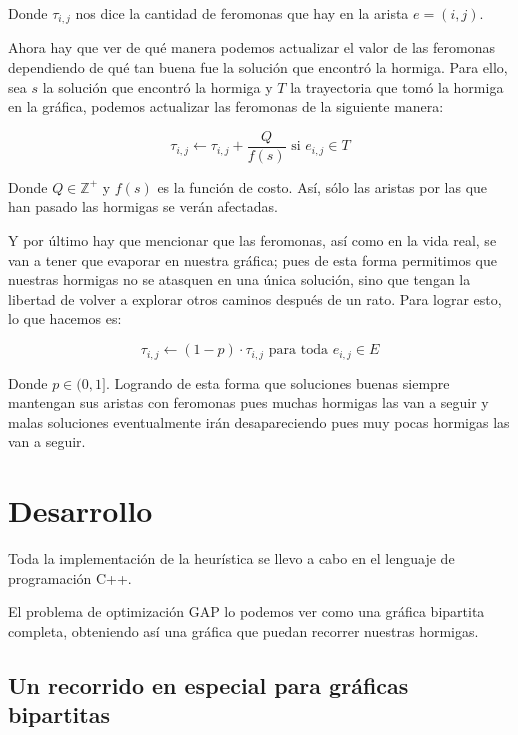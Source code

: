 \documentclass{article}
\begin{document}
    Donde $\tau_{i, j}$ nos dice la cantidad de feromonas que hay
    en la arista $e = (i, j)$.

    Ahora hay que ver de qué manera podemos actualizar el valor 
    de las feromonas dependiendo de qué tan buena fue la solución 
    que encontró la hormiga. Para ello, sea $s$ la solución que 
    encontró la hormiga y $T$ la trayectoria que tomó la 
    hormiga en la gráfica, podemos actualizar las feromonas de la 
    siguiente manera:

    \begin{equation} \label{update}
      \tau_{i, j} \leftarrow \tau_{i, j} + \frac{Q}{f(s)} \text{ si } e_{i, j} \in T
    \end{equation}

    Donde $Q \in \mathbb{Z}^+$ y $f(s)$ es la función de costo.
    Así, sólo las aristas por las que han pasado las hormigas se 
    verán afectadas.

    Y por último hay que mencionar que las feromonas, así como 
    en la vida real, se van a tener que evaporar en nuestra
    gráfica; pues de esta forma permitimos que nuestras 
    hormigas no se atasquen en una única solución, sino que
    tengan la libertad de volver a explorar otros caminos 
    después de un rato. Para lograr esto, lo que hacemos es: 

    \begin{equation} \label{evaporation}
      \tau_{i, j} \leftarrow (1 - p) \cdot \tau_{i, j} \text{ para toda } e_{i, j} \in E
    \end{equation}

    Donde $p \in (0, 1]$. Logrando de esta forma que 
    soluciones buenas siempre mantengan sus aristas con
    feromonas pues muchas hormigas las van a seguir y
    malas soluciones eventualmente irán desapareciendo
    pues muy pocas hormigas las van a seguir.

    \section{Desarrollo} \label{development}
    Toda la implementación de la heurística se llevo a cabo
    en el lenguaje de programación C++.

    El problema de optimización GAP lo podemos ver como una 
    gráfica bipartita completa, obteniendo así una gráfica 
    que puedan recorrer nuestras hormigas.

    \subsection{ Un recorrido en especial para gráficas bipartitas }
    
\end{document}
